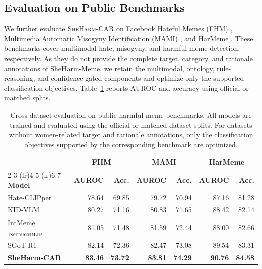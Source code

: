 \documentclass[11pt]{article}
\begin{document}

\subsection{Evaluation on Public Benchmarks}
\label{sec:public_benchmarks}

We further evaluate \textsc{SheHarm-CAR} on Facebook Hateful Memes
(FHM) \citep{kiela2020hateful}, Multimedia Automatic Misogyny
Identification (MAMI) \citep{fersini2022semeval}, and HarMeme
\citep{pramanick2021harmfulmemes}. These benchmarks cover multimodal
hate, misogyny, and harmful-meme detection, respectively. As they do
not provide the complete target, category, and rationale annotations
of SheHarm-Meme, we retain the multimodal, ontology, rule-reasoning,
and confidence-gated components and optimize only the supported
classification objectives. Table~\ref{tab:cross_dataset} reports
AUROC and accuracy using official or matched splits.
\begin{table}[t]
\centering
\small
\setlength{\tabcolsep}{7pt}
\begin{tabular}{lrrrrrr}
\toprule
& \multicolumn{2}{c}{\textbf{FHM}}
& \multicolumn{2}{c}{\textbf{MAMI}}
& \multicolumn{2}{c}{\textbf{HarMeme}} \\
\cmidrule(lr){2-3}
\cmidrule(lr){4-5}
\cmidrule(lr){6-7}
\textbf{Model}
& \textbf{AUROC} & \textbf{Acc.}
& \textbf{AUROC} & \textbf{Acc.}
& \textbf{AUROC} & \textbf{Acc.} \\
\midrule
Hate-CLIPper \citep{kumar2022hate}
& 78.64 & 69.85
& 79.72 & 70.94
& 87.16 & 81.28 \\

KID-VLM \citep{garg2025just}
& 80.27 & 71.16
& 80.83 & 71.65
& 88.42 & 82.14 \\

IntMeme$_{\textsc{InstructBLIP}}$ \citep{hee2025demystifying}
& 81.05 & 71.48
& 81.59 & 72.44
& 88.00 & 82.66 \\

SGoT-R1 \citep{wang2026sgotr1}
& 82.14 & 72.36
& 82.47 & 73.08
& 89.54 & 83.31 \\
\midrule

\textbf{SheHarm-CAR}
& \textbf{83.46} & \textbf{73.72}
& \textbf{83.81} & \textbf{74.29}
& \textbf{90.76} & \textbf{84.58} \\
\bottomrule
\end{tabular}
\caption{Cross-dataset evaluation on public harmful-meme benchmarks.
All models are trained and evaluated using the official or matched
dataset splits. For datasets without women-related target and rationale
annotations, only the classification objectives supported by the
corresponding benchmark are optimized.}
\label{tab:cross_dataset}
\end{table}
\end{document}
